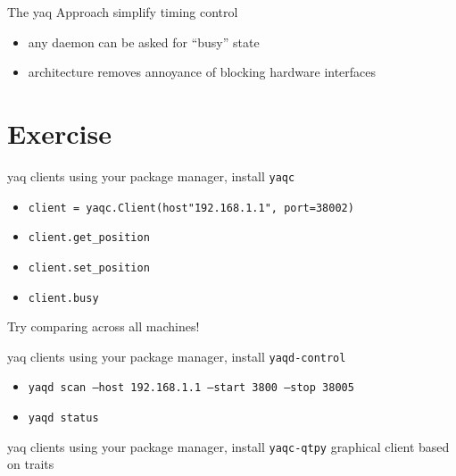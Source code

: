 \documentclass{presentation}
\begin{document}
\begin{frame}{The yaq Approach}
  simplify timing control
  \begin{itemize}
    \item{any daemon can be asked for ``busy'' state}
    \item{architecture removes annoyance of blocking hardware interfaces}
  \end{itemize}
\end{frame}

\section{Exercise}

\begin{frame}{yaq clients}
  using your package manager, install \texttt{yaqc}
  \begin{itemize}
    \item \texttt{client = yaqc.Client(host\="192.168.1.1", port=38002)}
    \item \texttt{client.get\_position}
    \item \texttt{client.set\_position}
    \item \texttt{client.busy}
  \end{itemize}
  Try comparing across all machines!
\end{frame}

\begin{frame}{yaq clients}
  using your package manager, install \texttt{yaqd-control}
  \begin{itemize}
    \item \texttt{yaqd scan --host 192.168.1.1 --start 3800 --stop 38005}
    \item \texttt{yaqd status}
  \end{itemize}
\end{frame}

\begin{frame}{yaq clients}
  using your package manager, install \texttt{yaqc-qtpy}
  \vfill
  graphical client based on traits
\end{frame}
\end{document}
